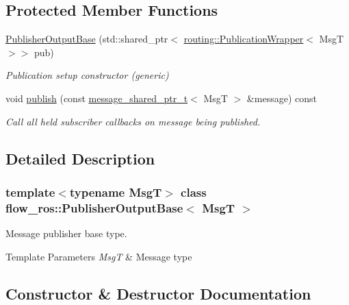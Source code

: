 \subsection*{Protected Member Functions}
\begin{DoxyCompactItemize}
\item 
\hyperlink{classflow__ros_1_1_publisher_output_base_a9e937b3b34f0a78ea03826b484dfa354}{Publisher\+Output\+Base} (std\+::shared\+\_\+ptr$<$ \hyperlink{classflow__ros_1_1routing_1_1_publication_wrapper}{routing\+::\+Publication\+Wrapper}$<$ MsgT $>$$>$ pub)
\begin{DoxyCompactList}\small\item\em Publication setup constructor (generic) \end{DoxyCompactList}\item 
void \hyperlink{classflow__ros_1_1_publisher_output_base_a66abc7f5296a4b2c29c776539df70cd1}{publish} (const \hyperlink{namespaceflow__ros_a21a684f38ee2083b3858613317c46d82}{message\+\_\+shared\+\_\+ptr\+\_\+t}$<$ MsgT $>$ \&message) const
\begin{DoxyCompactList}\small\item\em Call all held subscriber callbacks on message being published. \end{DoxyCompactList}\end{DoxyCompactItemize}


\subsection{Detailed Description}
\subsubsection*{template$<$typename MsgT$>$\newline
class flow\+\_\+ros\+::\+Publisher\+Output\+Base$<$ Msg\+T $>$}

Message publisher base type. 


\begin{DoxyTemplParams}{Template Parameters}
{\em MsgT} & Message type \\
\hline
\end{DoxyTemplParams}


\subsection{Constructor \& Destructor Documentation}
\mbox{\label{classflow__ros_1_1_publisher_output_base_a9e937b3b34f0a78ea03826b484dfa354}} 
